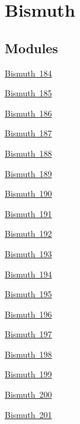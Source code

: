 \hypertarget{group___isotope_const-_bismuth}{}\section{Bismuth}
\label{group___isotope_const-_bismuth}
\subsection*{Modules}
\begin{DoxyCompactItemize}
\item 
\mbox{\hyperlink{group___isotope_const-_bismuth-_bi184}{Bismuth 184}}
\item 
\mbox{\hyperlink{group___isotope_const-_bismuth-_bi185}{Bismuth 185}}
\item 
\mbox{\hyperlink{group___isotope_const-_bismuth-_bi186}{Bismuth 186}}
\item 
\mbox{\hyperlink{group___isotope_const-_bismuth-_bi187}{Bismuth 187}}
\item 
\mbox{\hyperlink{group___isotope_const-_bismuth-_bi188}{Bismuth 188}}
\item 
\mbox{\hyperlink{group___isotope_const-_bismuth-_bi189}{Bismuth 189}}
\item 
\mbox{\hyperlink{group___isotope_const-_bismuth-_bi190}{Bismuth 190}}
\item 
\mbox{\hyperlink{group___isotope_const-_bismuth-_bi191}{Bismuth 191}}
\item 
\mbox{\hyperlink{group___isotope_const-_bismuth-_bi192}{Bismuth 192}}
\item 
\mbox{\hyperlink{group___isotope_const-_bismuth-_bi193}{Bismuth 193}}
\item 
\mbox{\hyperlink{group___isotope_const-_bismuth-_bi194}{Bismuth 194}}
\item 
\mbox{\hyperlink{group___isotope_const-_bismuth-_bi195}{Bismuth 195}}
\item 
\mbox{\hyperlink{group___isotope_const-_bismuth-_bi196}{Bismuth 196}}
\item 
\mbox{\hyperlink{group___isotope_const-_bismuth-_bi197}{Bismuth 197}}
\item 
\mbox{\hyperlink{group___isotope_const-_bismuth-_bi198}{Bismuth 198}}
\item 
\mbox{\hyperlink{group___isotope_const-_bismuth-_bi199}{Bismuth 199}}
\item 
\mbox{\hyperlink{group___isotope_const-_bismuth-_bi200}{Bismuth 200}}
\item 
\mbox{\hyperlink{group___isotope_const-_bismuth-_bi201}{Bismuth 201}}

\end{DoxyCompactItemize}
